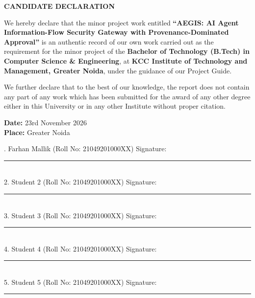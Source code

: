 \newpage
\thispagestyle{plain}
\begin{center}
{\Large \textbf{CANDIDATE DECLARATION}}\\[1.0cm]
\end{center}

\noindent We hereby declare that the minor project work entitled \textbf{``AEGIS: AI Agent Information-Flow Security Gateway with Provenance-Dominated Approval''} is an authentic record of our own work carried out as the requirement for the minor project of the \textbf{Bachelor of Technology (B.Tech) in Computer Science \& Engineering}, at \textbf{KCC Institute of Technology and Management, Greater Noida}, under the guidance of our Project Guide.

\vspace{0.4cm}
\noindent We further declare that to the best of our knowledge, the report does not contain any part of any work which has been submitted for the award of any other degree either in this University or in any other Institute without proper citation.

\vspace{0.8cm}
\noindent \textbf{Date:} 23rd November 2026\\
\textbf{Place:} Greater Noida

\vspace{1.5cm}

. Farhan Mallik (Roll No: 21049201000XX) \hfill Signature: \rule{4.5cm}{0.4pt}\\[0.5cm]
2. Student 2 (Roll No: 21049201000XX) \hfill Signature: \rule{4.5cm}{0.4pt}\\[0.5cm]
3. Student 3 (Roll No: 21049201000XX) \hfill Signature: \rule{4.5cm}{0.4pt}\\[0.5cm]
4. Student 4 (Roll No: 21049201000XX) \hfill Signature: \rule{4.5cm}{0.4pt}\\[0.5cm]
5. Student 5 (Roll No: 21049201000XX) \hfill Signature: \rule{4.5cm}{0.4pt}
